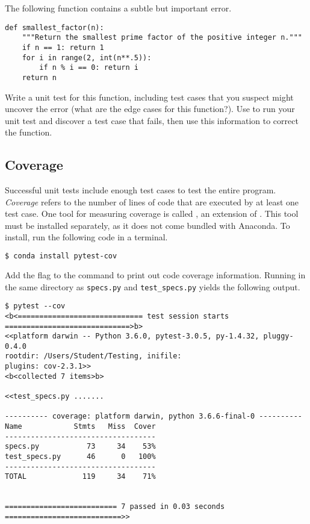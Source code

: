 \begin{problem} %
The following function contains a subtle but important error.
\begin{lstlisting}
def smallest_factor(n):
    """Return the smallest prime factor of the positive integer n."""
    if n == 1: return 1
    for i in range(2, int(n**.5)):
        if n % i == 0: return i
    return n
\end{lstlisting}
Write a unit test for this function, including test cases that you suspect might uncover the error (what are the edge cases for this function?).
Use  to run your unit test and discover a test case that fails, then use this information to correct the function.
\label{prob:unittest_intro}
\end{problem}

\subsection*{Coverage} %

Successful unit tests include enough test cases to test the entire program.
\emph{Coverage} refers to the number of lines of code that are executed by at least one test case.
One tool for measuring coverage is called , an extension of .
This tool must be installed separately, as it does not come bundled with Anaconda. 
To install, run the following code in a terminal.

\begin{lstlisting}[language=bash]
$ conda install pytest-cov
\end{lstlisting}

Add the flag  to the  command to print out code coverage information.
Running  in the same directory as \texttt{specs.py} and \texttt{test\_specs.py} yields the following output.

\begin{lstlisting}
$ pytest --cov
<b<============================= test session starts =============================>b>
<<platform darwin -- Python 3.6.0, pytest-3.0.5, py-1.4.32, pluggy-0.4.0
rootdir: /Users/Student/Testing, inifile:
plugins: cov-2.3.1>>
<b<collected 7 items>b>

<<test_specs.py .......

---------- coverage: platform darwin, python 3.6.6-final-0 ----------
Name            Stmts   Miss  Cover
-----------------------------------
specs.py           73     34    53%
test_specs.py      46      0   100%
-----------------------------------
TOTAL             119     34    71%


========================== 7 passed in 0.03 seconds ===========================>>\end{lstlisting}


